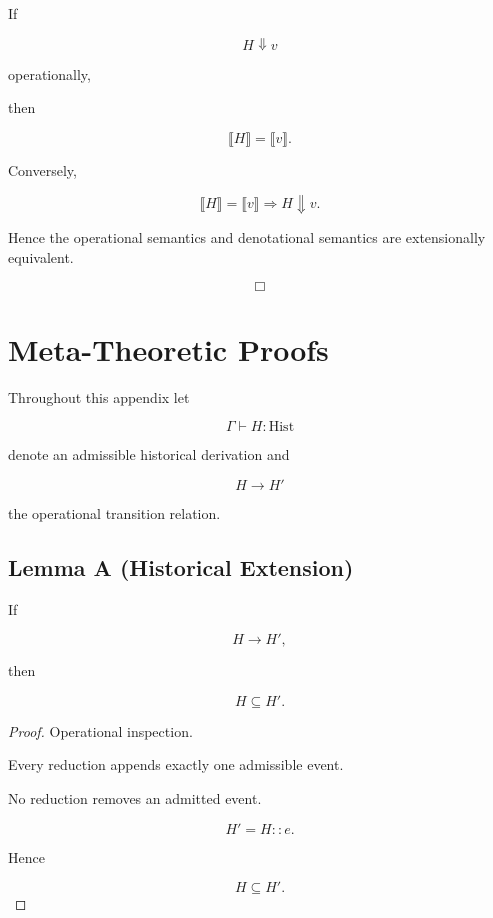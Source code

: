 \documentclass[12pt,oneside]{article}
\theoremstyle{definition}
\theoremstyle{remark}
\begin{document}
If

\[
H
\Downarrow
v
\]

operationally,

then

\[
\llbracket
H
\rrbracket
=
\llbracket
v
\rrbracket.
\]

Conversely,

\[
\llbracket
H
\rrbracket
=
\llbracket
v
\rrbracket
\Longrightarrow
H
\Downarrow
v.
\]

Hence the operational semantics and denotational semantics are extensionally equivalent.

\[
\Box
\]

\section{Meta-Theoretic Proofs}

Throughout this appendix let

\[
\Gamma\vdash H:\mathrm{Hist}
\]

denote an admissible historical derivation and

\[
H
\longrightarrow
H'
\]

the operational transition relation.

\subsection*{Lemma A (Historical Extension)}

If

\[
H
\longrightarrow
H',
\]

then

\[
H
\subseteq
H'.
\]

\begin{proof}

Operational inspection.

Every reduction appends exactly one admissible event.

No reduction removes an admitted event.

\[
H'
=
H::e.
\]

Hence

\[
H
\subseteq
H'.
\]

\end{proof}

\end{document}
